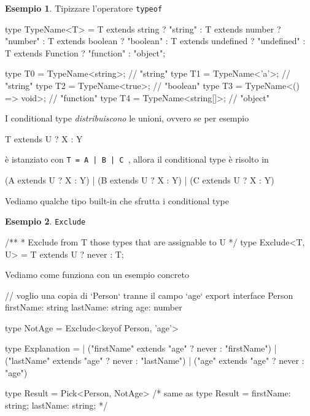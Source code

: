 \documentclass[12pt]{article}
\theoremstyle{definition}
\newtheorem{example}{Esempio}[subsection]
\newenvironment{code}
  {\vspace{0.5cm} \VerbatimEnvironment\begin{typescriptcode}}
  {\end{typescriptcode} \vspace{0.2cm}}
\begin{document}
\begin{example}
Tipizzare l'operatore \texttt{typeof}

\begin{code}
type TypeName<T> =
    T extends string ? "string" :
    T extends number ? "number" :
    T extends boolean ? "boolean" :
    T extends undefined ? "undefined" :
    T extends Function ? "function" :
    "object";

type T0 = TypeName<string>;  // "string"
type T1 = TypeName<'a'>;  // "string"
type T2 = TypeName<true>;  // "boolean"
type T3 = TypeName<() => void>;  // "function"
type T4 = TypeName<string[]>;  // "object"
\end{code}
\end{example}

I conditional type \emph{distribuiscono} le unioni, ovvero se per esempio

\begin{code}
T extends U ? X : Y
\end{code}

è istanziato con \texttt{T = A | B | C }, allora il conditional type è risolto in

\begin{code}
  (A extends U ? X : Y)
| (B extends U ? X : Y)
| (C extends U ? X : Y)
\end{code}

Vediamo qualche tipo built-in che sfrutta i conditional type

\begin{example}
\texttt{Exclude}

\begin{code}
/**
 * Exclude from T those types that are assignable to U
 */
type Exclude<T, U> = T extends U ? never : T;
\end{code}
\end{example}

Vediamo come funziona con un esempio concreto

\begin{code}
// voglio una copia di `Person` tranne il campo `age`
export interface Person {
  firstName: string
  lastName: string
  age: number
}

type NotAge = Exclude<keyof Person, 'age'>

type Explanation =
  | ("firstName" extends "age" ? never : "firstName")
  | ("lastName" extends "age" ? never : "lastName")
  | ("age" extends "age" ? never : "age")

type Result = Pick<Person, NotAge>
/* same as
type Result = {
    firstName: string;
    lastName: string;
}
*/
\end{code}
\end{document}
